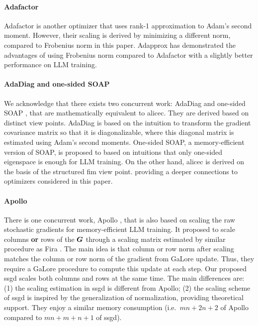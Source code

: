 \paragraph{Adafactor}
Adafactor \citep{shazeer2018adafactor} is another optimizer that uses rank-1 approximation to Adam's second moment. However, their scaling is derived by minimizing a different norm, compared to Frobenius norm in this paper. Adapprox \cite{zhao2024adapprox} has demonstrated the advantages of using Frobenius norm compared to Adafactor with a slightly better performance on LLM training. 

\paragraph{AdaDiag and one-sided SOAP}
We acknowledge that there exists two concurrent work: AdaDiag \citep{anonymous2024improving} and one-sided SOAP \citep{vyas2024soap}, that are mathematically equivalent to \gls{alicec}. They are derived based on distinct view points. AdaDiag is based on the intuition to transform the gradient covariance matrix so that it is diagonalizable, where this diagonal matrix is estimated using Adam's second moments. One-sided SOAP, a memory-efficient version of SOAP, is proposed to based on intuitions that only one-sided eigenspace is enough for LLM training. On the other hand, \gls{alicec} is derived on the basis of the structured \gls{fim} view point. providing a deeper connections to optimizers considered in this paper. 



\paragraph{Apollo}
There is one concurrent work, Apollo \citep{zhu2024apollo}, that is also based on scaling the raw stochastic gradients for memory-efficient LLM training. It proposed to scale columns \textbf{or} rows of the ${\bm{G}}$ through a scaling matrix estimated by similar procedure as Fira \cite{chen2024fira}. The main idea is that column or row norm after scaling matches the column or row norm of the gradient from GaLore update. Thus, they require a GaLore procedure to compute this update at each step. Our proposed \gls{ssgd} scales both columns and rows at the same time. The main differences are: (1) the scaling estimation in \gls{ssgd} is different from Apollo; (2) the scaling scheme of \gls{ssgd} is inspired by the generalization of normalization, providing theoretical support. They enjoy a similar memory consumption (i.e.~$mn+2n+2$ of Apollo compared to $mn+m+n+1$ of \gls{ssgd}). 

